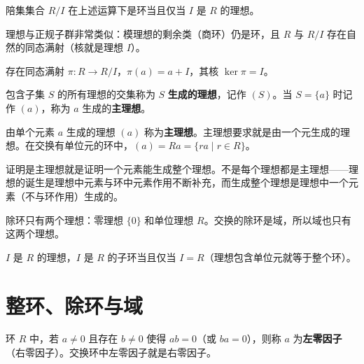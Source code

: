 \begin{proposition}[命题 2.9：商环成环的条件]
陪集集合 $R/I$ 在上述运算下是环当且仅当 $I$ 是 $R$ 的理想。
\end{proposition}

\begin{theorem}[定理 1：理想与正规子群类比]
理想与正规子群非常类似：模理想的剩余类（商环）仍是环，且 $R$ 与 $R/I$ 存在自然的同态满射（核就是理想 $I$）。
\end{theorem}

\begin{theorem}[定理 2：$R$ 与商环同态]
存在同态满射 $\pi\colon R \to R/I$，$\pi(a) = a + I$，其核 $\ker \pi = I$。
\end{theorem}

\begin{definition}[生成理想（定义 2.13）]
包含子集 $S$ 的所有理想的交集称为 $S$ \textbf{生成的理想}，记作 $(S)$。当 $S = \{a\}$ 时记作 $(a)$，称为 $a$ 生成的\textbf{主理想}。
\end{definition}

\begin{definition}[主理想（定义 2.14）]
由单个元素 $a$ 生成的理想 $(a)$ 称为\textbf{主理想}。主理想要求就是由一个元生成的理想。在交换有单位元的环中，$(a) = Ra = \{ra \mid r \in R\}$。
\end{definition}

\begin{note}
证明是主理想就是证明一个元素能生成整个理想。不是每个理想都是主理想——理想的诞生是理想中元素与环中元素作用不断补充，而生成整个理想是理想中一个元素（不与环作用）生成的。
\end{note}

\begin{theorem}[定理 1：除环只有两个理想]
除环只有两个理想：零理想 $\{0\}$ 和单位理想 $R$。交换的除环是域，所以域也只有这两个理想。
\end{theorem}

\begin{lemma}[引理 2.2：理想与子环的关系]
$I$ 是 $R$ 的理想，$I$ 是 $R$ 的子环当且仅当 $I = R$（理想包含单位元就等于整个环）。
\end{lemma}

\section{整环、除环与域}

\begin{definition}[零因子]
环 $R$ 中，若 $a \ne 0$ 且存在 $b \ne 0$ 使得 $ab = 0$（或 $ba = 0$），则称 $a$ 为\textbf{左零因子}（右零因子）。交换环中左零因子就是右零因子。
\end{definition}

